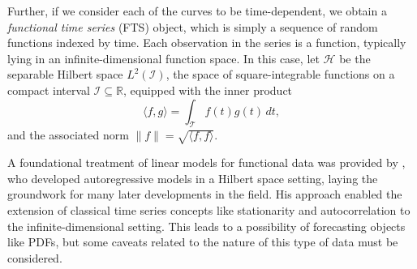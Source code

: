 \documentclass[
	12pt,				%
	oneside,			%
	a4paper,			%
	english,			%
	brazil				%
	]{abntex2ppgsi}
\begin{document}


Further, if we consider each of the curves to be time-dependent, we obtain a \emph{functional time series} (FTS) object, which is simply a sequence of random functions indexed by time. Each observation in the series is a function, typically lying in an infinite-dimensional function space. In this case, let $\mathcal{H}$ be the separable Hilbert space $L^2(\mathcal{I})$, the space of square-integrable functions on a compact interval $\mathcal{I} \subseteq \mathbb{R}$, equipped with the inner product
\[
\langle f, g \rangle = \int_{\mathcal{T}} f(t) g(t) \, dt,
\]
and the associated norm $\|f\| = \sqrt{\langle f, f \rangle}$.





A foundational treatment of linear models for functional data was provided by , who developed autoregressive models in a Hilbert space setting, laying the groundwork for many later developments in the field. His approach enabled the extension of classical time series concepts like stationarity and autocorrelation to the infinite-dimensional setting. This leads to a possibility of forecasting objects like PDFs, but some caveats related to the nature of this type of data must be considered. 
\end{document}
